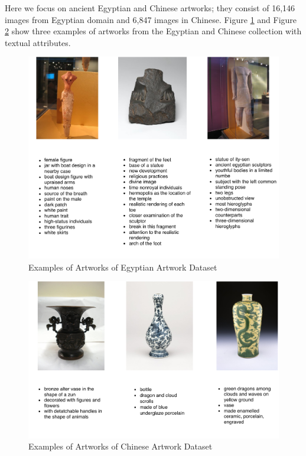 
Here we focus on ancient Egyptian and Chinese artworks; 
they consist of 16,146 images from Egyptian domain and 6,847 images in Chinese. Figure \ref{fig:sampleEgyptian} and Figure \ref{fig:sampleChinese} show three examples of artworks from the Egyptian and Chinese collection with textual attributes.

\begin{figure}[h!]
\centering
\includegraphics[width=.8\textwidth]{egyptian.pdf}
\caption{Examples of Artworks of Egyptian Artwork Dataset}
\label{fig:sampleEgyptian}
\end{figure}

\begin{figure}[h!]
\centering
\includegraphics[width=.9\textwidth]{chinese.pdf}
\caption{Examples of Artworks of Chinese Artwork Dataset}
\label{fig:sampleChinese}
\end{figure}


